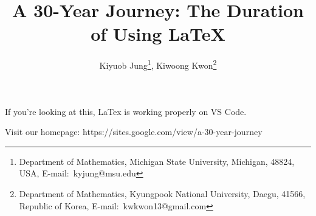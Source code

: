 \documentclass[a4paper,11pt]{article}
\title{
    A 30-Year Journey: The Duration of Using LaTeX
    }
\author{
    Kiyuob Jung\thanks{Department of Mathematics, Michigan State University, Michigan, 48824, USA, E-mail:~kyjung@msu.edu},
    Kiwoong Kwon\thanks{Department of Mathematics, Kyungpook National University, Daegu, 41566, Republic of Korea, E-mail:~kwkwon13@gmail.com}
    }
\begin{document}
\date{}
\maketitle

If you're looking at this, LaTex is working properly on VS Code.

Visit our homepage: https://sites.google.com/view/a-30-year-journey
\end{document}
